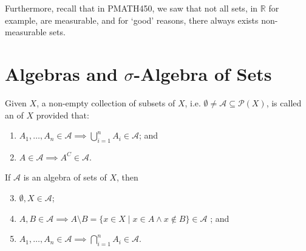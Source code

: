 \documentclass[notoc,notitlepage]{tufte-book}
\begin{document}
Furthermore, recall that in PMATH450, we saw that not all
sets, in $\mathbb{R}$ for example, are measurable,
and for `good' reasons, there always exists non-measurable sets.


\section{Algebras and \texorpdfstring{$\sigma$}{sigma}-Algebra of Sets}%
\label{sec:algebras_and_sigma_algebra_of_sets}


\begin{defn}\label{defn:algebra_of_sets}
  Given $X$, a non-empty collection of subsets of $X$,
  i.e. $\emptyset \neq \mathcal{A} \subseteq \mathcal{P}(X)$,
  is called an  of $X$ provided that:
  \begin{enumerate}
    \item $A_1, \ldots, A_n \in \mathcal{A} \implies
      \bigcup_{i=1}^{n} A_i \in \mathcal{A}$; and
    \item $A \in \mathcal{A} \implies A^C \in \mathcal{A}$.
  \end{enumerate}
\end{defn}

\begin{propo}\label{propo:properties_of_algebra_of_sets}
  If $\mathcal{A}$ is an algebra of sets of $X$, then
  \begin{enumerate}
    \setcounter{enumi}{2}
    \item $\emptyset, X \in \mathcal{A}$;
    \item $A, B \in \mathcal{A} \implies
      A \setminus B = \{ x \in X \mid x \in A \land x \notin B \} \in
      \mathcal{A}$ ; and
    \item $A_1, \ldots, A_n \in \mathcal{A} \implies
      \bigcap_{i=1}^{n} A_i \in \mathcal{A}$.
  \end{enumerate}
\end{propo}
\end{document}
